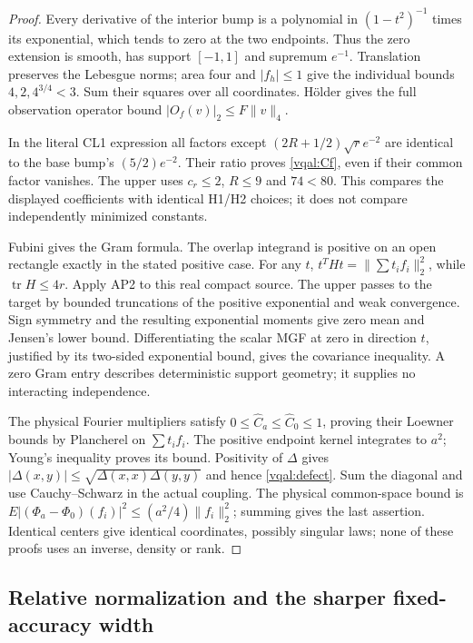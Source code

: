 \documentclass[11pt]{article}
\theoremstyle{plain}
\theoremstyle{definition}
\theoremstyle{remark}
\begin{document}
\begin{proof}
Every derivative of the interior bump is a polynomial in
$(1-t^2)^{-1}$ times its exponential, which tends to zero at the two
endpoints. Thus the zero extension is smooth, has support $[-1,1]$ and
supremum $e^{-1}$. Translation preserves the Lebesgue norms; area four
and $|f_h|\le1$ give the individual bounds $4,2,4^{3/4}<3$.
Sum their squares over all coordinates. H\"older gives the full
observation operator bound $|O_f(v)|_2\le F\|v\|_4$.

In the literal CL1 expression all factors except
$(2R+1/2)\sqrt r e^{-2}$ are identical to the base bump's
$(5/2)e^{-2}$. Their ratio proves \eqref{vqal:Cf}, even if their common
factor vanishes. The upper uses $c_r\le2$, $R\le9$ and $74<80$.
This compares the displayed coefficients with identical H1/H2 choices;
it does not compare independently minimized constants.

Fubini gives the Gram formula. The overlap integrand is positive on an
open rectangle exactly in the stated positive case. For any $t$,
$t^THt=\|\sum t_if_i\|_2^2$, while $\operatorname{tr}H\le4r$.
Apply AP2 to this real compact source. The upper passes to the target
by bounded truncations of the positive exponential and weak convergence.
Sign symmetry and the resulting exponential moments give zero mean and
Jensen's lower bound. Differentiating the scalar MGF at zero in direction
$t$, justified by its two-sided exponential bound, gives the covariance
inequality. A zero Gram entry describes deterministic support geometry;
it supplies no interacting independence.

The physical Fourier multipliers satisfy
$0\le\widehat C_a\le\widehat C_0\le1$, proving their Loewner bounds
by Plancherel on $\sum t_if_i$. The positive endpoint kernel integrates
to $a^2$; Young's inequality proves its bound. Positivity of $\Delta$
gives $|\Delta(x,y)|\le\sqrt{\Delta(x,x)\Delta(y,y)}$ and hence
\eqref{vqal:defect}. Sum the diagonal and use Cauchy--Schwarz in the
actual coupling. The physical common-space bound is
$E|(\Phi_a-\Phi_0)(f_i)|^2\le(a^2/4)\|f_i\|_2^2$; summing gives the
last assertion. Identical centers give identical coordinates, possibly
singular laws; none of these proofs uses an inverse, density or rank.
\end{proof}

\subsection{Relative normalization and the sharper fixed-accuracy width}
\label{vqal:relative}
\end{document}
